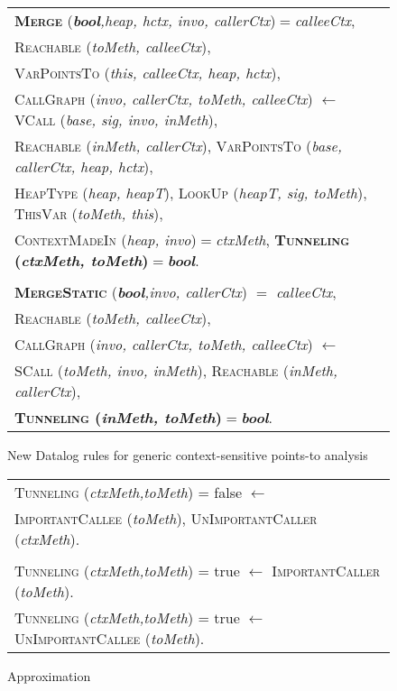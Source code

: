 \begin{figure}[t]
\begin{tabularx}{\textwidth}{|X|}
  \hline
  \textbf{\textsc{Merge}} (\emph{\textbf{bool},heap, hctx, invo,
    callerCtx})$=$\emph{calleeCtx}, \\
  \textsc{Reachable} (\emph{toMeth, calleeCtx}), \\
  \textsc{VarPointsTo} (\emph{this, calleeCtx,
    heap, hctx}), \\
  \textsc{CallGraph} (\emph{invo, callerCtx,
    toMeth, calleeCtx})
  $\leftarrow$ \textsc{VCall} (\emph{base, sig, invo, inMeth}), \\
  \quad		
  \textsc{Reachable} (\emph{inMeth, callerCtx}),
  \textsc{VarPointsTo} (\emph{base, callerCtx, heap, hctx}), \\
  \quad		\textsc{HeapType} (\emph{heap, heapT}),
  \textsc{LookUp} (\emph{heapT, sig, toMeth}),
  \textsc{ThisVar} (\emph{toMeth, this}),\\
  \quad \textsc{ContextMadeIn} (\emph{heap, invo})$=$\emph{ctxMeth},
  \textbf{\textsc{Tunneling} (\emph{ctxMeth, toMeth})$=$\emph{bool}}.\\\\
  
  
  
  \textbf{\textsc{MergeStatic}} (\emph{\textbf{bool},invo,
    callerCtx}) $=$ \emph{calleeCtx}, \\
  \textsc{Reachable} (\emph{toMeth, calleeCtx}), \\
  \textsc{CallGraph} (\emph{invo, callerCtx,
    toMeth, calleeCtx})
  $\leftarrow$ \\
  \quad \textsc{SCall} (\emph{toMeth, invo, inMeth}),
  \textsc{Reachable} (\emph{inMeth, callerCtx}),\\
  \quad \textbf{\textsc{Tunneling} (\emph{inMeth, toMeth})$=$\emph{bool}}.

 
  \\
  \hline
\end{tabularx}
\caption{New Datalog rules for generic context-sensitive points-to analysis}
\label{fig:pointsto}
\end{figure}

\begin{figure}[t]
\begin{tabularx}{\textwidth}{|X|}
  \hline  
  {\textsc{Tunneling}} (\emph{ctxMeth,toMeth}) = false 
  $\leftarrow$\\ \quad  \textsc{ImportantCallee} (\emph{toMeth}), 
  \textsc{UnImportantCaller} (\emph{ctxMeth}).\\\\
  
  {\textsc{Tunneling}} (\emph{ctxMeth,toMeth}) = true 
  $\leftarrow$  \textsc{ImportantCaller} (\emph{toMeth}).\\
  
  {\textsc{Tunneling}} (\emph{ctxMeth,toMeth}) = true
  $\leftarrow$  \textsc{UnImportantCallee} (\emph{toMeth}).\\
  \hline
\end{tabularx}
\caption{Approximation}
\label{fig:pointsto}
\end{figure}
